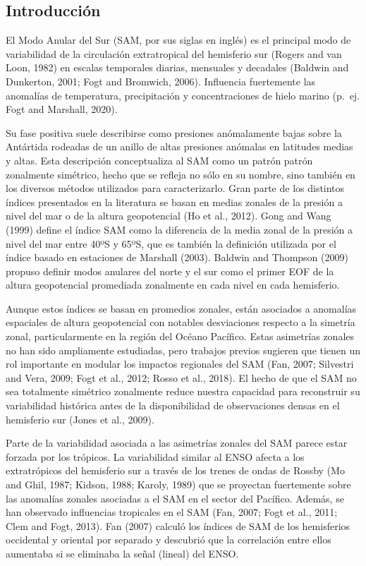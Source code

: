 \documentclass[12pt,oneside]{reedthesis}
\begin{document}
\hypertarget{introducciuxf3n-1}{%
\subsection{Introducción}\label{introducciuxf3n-1}}

El Modo Anular del Sur (SAM, por sus siglas en inglés) es el principal modo de variabilidad de la circulación extratropical del hemisferio sur (Rogers and van Loon, 1982) en escalas temporales diarias, mensuales y decadales (Baldwin and Dunkerton, 2001; Fogt and Bromwich, 2006).
Influencia fuertemente las anomalías de temperatura, precipitación y concentraciones de hielo marino (p.~ej. Fogt and Marshall, 2020).

Su fase positiva suele describirse como presiones anómalamente bajas sobre la Antártida rodeadas de un anillo de altas presiones anómalas en latitudes medias y altas.
Esta descripción conceptualiza al SAM como un patrón patrón zonalmente simétrico, hecho que se refleja no sólo en su nombre, sino también en los diversos métodos utilizados para caracterizarlo.
Gran parte de los distintos índices presentados en la literatura se basan en medias zonales de la presión a nivel del mar o de la altura geopotencial (Ho et al., 2012).
Gong and Wang (1999) define el índice SAM como la diferencia de la media zonal de la presión a nivel del mar entre 40ºS y 65ºS, que es también la definición utilizada por el índice basado en estaciones de Marshall (2003).
Baldwin and Thompson (2009) propuso definir modos anulares del norte y el sur como el primer EOF de la altura geopotencial promediada zonalmente en cada nivel en cada hemisferio.

Aunque estos índices se basan en promedios zonales, están asociados a anomalías espaciales de altura geopotencial con notables desviaciones respecto a la simetría zonal, particularmente en la región del Océano Pacífico.
Estas asimetrías zonales no han sido ampliamente estudiadas, pero trabajos previos sugieren que tienen un rol importante en modular los impactos regionales del SAM (Fan, 2007; Silvestri and Vera, 2009; Fogt et al., 2012; Rosso et al., 2018).
El hecho de que el SAM no sea totalmente simétrico zonalmente reduce nuestra capacidad para reconstruir su variabilidad histórica antes de la disponibilidad de observaciones densas en el hemisferio sur (Jones et al., 2009).

Parte de la variabilidad asociada a las asimetrías zonales del SAM parece estar forzada por los trópicos.
La variabilidad similar al ENSO afecta a los extratrópicos del hemisferio sur a través de los trenes de ondas de Rossby (Mo and Ghil, 1987; Kidson, 1988; Karoly, 1989) que se proyectan fuertemente sobre las anomalías zonales asociadas a el SAM en el sector del Pacífico.
Además, se han observado influencias tropicales en el SAM (Fan, 2007; Fogt et al., 2011; Clem and Fogt, 2013).
Fan (2007) calculó los índices de SAM de los hemisferios occidental y oriental por separado y descubrió que la correlación entre ellos aumentaba si se eliminaba la señal (lineal) del ENSO.
\end{document}
